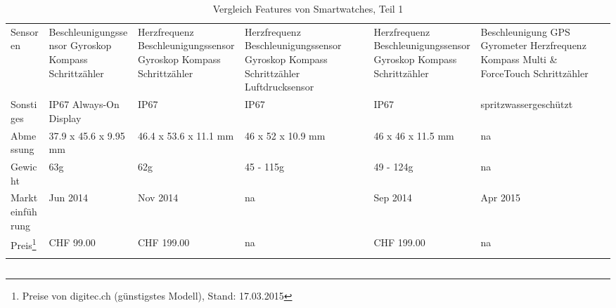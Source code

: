 \begin{landscape}
\begin{longtable}{p{2.8cm}p{3.5cm}p{3.5cm}p{3.5cm}p{3.5cm}p{3.5cm}}
	Sensoren
		& Beschleunigungssensor \newline
			Gyroskop \newline
			Kompass \newline
			Schrittzähler
		& Herzfrequenz \newline
        		Beschleunigungssensor \newline
			Gyroskop \newline
			Kompass \newline
			Schrittzähler
		& Herzfrequenz \newline
        		Beschleunigungssensor \newline
			Gyroskop \newline
			Kompass \newline
			Schrittzähler \newline
			Luftdrucksensor
		& Herzfrequenz \newline
		    Beschleunigungssensor \newline
			Gyroskop \newline
			Kompass \newline
			Schrittzähler
		& Beschleunigung \newline
			GPS \newline
			Gyrometer \newline
			Herzfrequenz \newline
			Kompass \newline
			Multi \& ForceTouch \newline
			Schrittzähler \\
	Sonstiges
		& IP67 \newline
			Always-On Display
		& IP67
		& IP67
		& IP67
		& spritzwassergeschützt \\
	Abmessung
		& 37.9 x 45.6 x 9.95 mm
		& 46.4 x 53.6 x 11.1 mm
		& 46 x 52 x 10.9 mm
		& 46 x 46 x 11.5 mm
		& na\\
	Gewicht
		& 63g
		& 62g
		& 45 - 115g
		& 49 - 124g
		& na\\ 
	Markteinführung
		& Jun 2014
		& Nov 2014
		& na 
		& Sep 2014
		& Apr 2015\\
	Preis\footnote{Preise von digitec.ch (günstigstes Modell), Stand: 17.03.2015}
		& CHF 99.00
		& CHF 199.00
		& na
		& CHF 199.00
		& na \\
	\hline
	\caption{Vergleich Features von Smartwatches, Teil 1} \\
\end{longtable}
\newpage

\begin{longtable}{p{2.8cm}p{3.5cm}p{3.5cm}p{3.5cm}p{3.5cm}p{3.5cm}}


\end{longtable}
\end{landscape}
